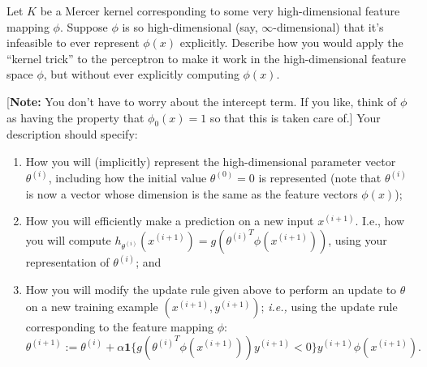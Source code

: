 \item {} Let $K$ be a Mercer kernel corresponding to some
very high-dimensional feature
mapping $\phi$. Suppose $\phi$ is so high-dimensional (say,
$\infty$-dimensional) that it's infeasible to ever represent $\phi(x)$
explicitly.  Describe how you would apply the ``kernel trick'' to the
perceptron to make it work in the high-dimensional feature space $\phi$, but
without ever explicitly computing $\phi(x)$.

[\textbf{Note:} You don't have to worry about the intercept term.  If you like,
think of $\phi$ as having the property that $\phi_0(x) = 1$ so that this is
taken care of.] Your description should specify:
\begin{enumerate}[label=\roman*.]
  \item {} How you will (implicitly) represent the
  high-dimensional
    parameter vector $\theta^{(i)}$, including how the initial value
    $\theta^{(0)} = 0$ is represented (note that $\theta^{(i)}$ is
    now a vector whose dimension is the same as the feature vectors
    $\phi(x)$);
  \item {} How you will efficiently make a prediction on a
  new input
    $x^{(i+1)}$.  I.e., how you will compute
    $h_{\theta^{(i)}}(x^{(i+1)}) = g({\theta^{(i)}}^T \phi(x^{(i+1)}))$,
    using your representation of $\theta^{(i)}$; and
  \item {} How you will modify the update rule given above
  to perform an
  update to $\theta$ on a new training example $(x^{(i+1)}, y^{(i+1)})$;
  \emph{i.e.,} using the update rule corresponding to the feature mapping
  $\phi$:
  \begin{equation*}
    \theta^{(i+1)} := \theta^{(i)}
      + \alpha \mathbf{1}\{g({\theta^{(i)}}^T \phi(x^{(i + 1)})) y^{(i+1)}
      < 0\} y^{(i+1)} \phi(x^{(i+1)}).
  \end{equation*}
\end{enumerate}

\ifnum{} {
  
} \fi
